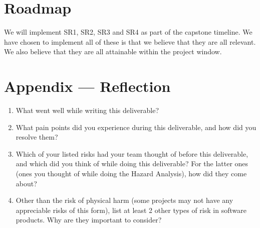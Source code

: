 \documentclass{article}
\begin{document}

\section{Roadmap}


We will implement SR1, SR2, SR3 and SR4 as part of the capstone timeline.
We have chosen to implement all of these is that we believe that they are all relevant.
We also believe that they are all attainable within the project window.

\newpage{}

\section*{Appendix --- Reflection}




\begin{enumerate}
    \item What went well while writing this deliverable? 
    \item What pain points did you experience during this deliverable, and how
    did you resolve them?
    \item Which of your listed risks had your team thought of before this
    deliverable, and which did you think of while doing this deliverable? For
    the latter ones (ones you thought of while doing the Hazard Analysis), how
    did they come about?
    \item Other than the risk of physical harm (some projects may not have any
    appreciable risks of this form), list at least 2 other types of risk in
    software products. Why are they important to consider?
\end{enumerate}
\end{document}
